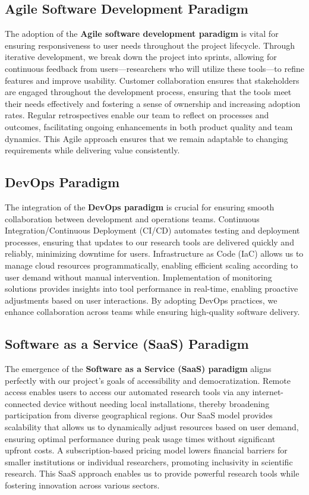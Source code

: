 \subsection{Agile Software Development Paradigm}

The adoption of the \textbf{Agile software development paradigm} is vital for ensuring responsiveness to user needs throughout the project lifecycle. Through iterative development, we break down the project into sprints, allowing for continuous feedback from users—researchers who will utilize these tools—to refine features and improve usability. Customer collaboration ensures that stakeholders are engaged throughout the development process, ensuring that the tools meet their needs effectively and fostering a sense of ownership and increasing adoption rates. Regular retrospectives enable our team to reflect on processes and outcomes, facilitating ongoing enhancements in both product quality and team dynamics. This Agile approach ensures that we remain adaptable to changing requirements while delivering value consistently.

\subsection{DevOps Paradigm}

The integration of the \textbf{DevOps paradigm} is crucial for ensuring smooth collaboration between development and operations teams. Continuous Integration/Continuous Deployment (CI/CD) automates testing and deployment processes, ensuring that updates to our research tools are delivered quickly and reliably, minimizing downtime for users. Infrastructure as Code (IaC) allows us to manage cloud resources programmatically, enabling efficient scaling according to user demand without manual intervention. Implementation of monitoring solutions provides insights into tool performance in real-time, enabling proactive adjustments based on user interactions. By adopting DevOps practices, we enhance collaboration across teams while ensuring high-quality software delivery.

\subsection{Software as a Service (SaaS) Paradigm}

The emergence of the \textbf{Software as a Service (SaaS) paradigm} aligns perfectly with our project's goals of accessibility and democratization. Remote access enables users to access our automated research tools via any internet-connected device without needing local installations, thereby broadening participation from diverse geographical regions. Our SaaS model provides scalability that allows us to dynamically adjust resources based on user demand, ensuring optimal performance during peak usage times without significant upfront costs. A subscription-based pricing model lowers financial barriers for smaller institutions or individual researchers, promoting inclusivity in scientific research. This SaaS approach enables us to provide powerful research tools while fostering innovation across various sectors.

